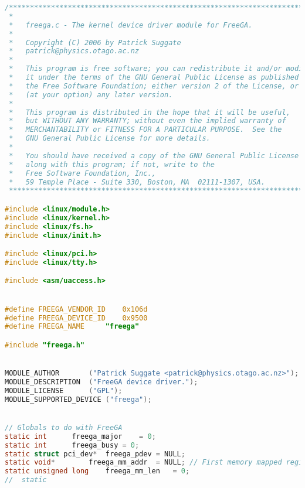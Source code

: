 \begin{lstlisting}[language=C]
/***************************************************************************
 *                                                                         *
 *   freega.c - The kernel device driver module for FreeGA.                *
 *                                                                         *
 *   Copyright (C) 2006 by Patrick Suggate                                 *
 *   patrick@physics.otago.ac.nz                                           *
 *                                                                         *
 *   This program is free software; you can redistribute it and/or modify  *
 *   it under the terms of the GNU General Public License as published by  *
 *   the Free Software Foundation; either version 2 of the License, or     *
 *   (at your option) any later version.                                   *
 *                                                                         *
 *   This program is distributed in the hope that it will be useful,       *
 *   but WITHOUT ANY WARRANTY; without even the implied warranty of        *
 *   MERCHANTABILITY or FITNESS FOR A PARTICULAR PURPOSE.  See the         *
 *   GNU General Public License for more details.                          *
 *                                                                         *
 *   You should have received a copy of the GNU General Public License     *
 *   along with this program; if not, write to the                         *
 *   Free Software Foundation, Inc.,                                       *
 *   59 Temple Place - Suite 330, Boston, MA  02111-1307, USA.             *
 ***************************************************************************/

#include <linux/module.h>
#include <linux/kernel.h>
#include <linux/fs.h>
#include <linux/init.h>

#include <linux/pci.h>
#include <linux/tty.h>

#include <asm/uaccess.h>


#define	FREEGA_VENDOR_ID	0x106d
#define	FREEGA_DEVICE_ID	0x9500
#define	FREEGA_NAME		"freega"

#include "freega.h"


MODULE_AUTHOR		("Patrick Suggate <patrick@physics.otago.ac.nz>");
MODULE_DESCRIPTION	("FreeGA device driver.");
MODULE_LICENSE		("GPL");
MODULE_SUPPORTED_DEVICE	("freega");


// Globals to do with FreeGA
static int		freega_major	= 0;
static int		freega_busy	= 0;
static struct pci_dev*	freega_pdev	= NULL;
static void*		freega_mm_addr	= NULL;	// First memory mapped region
static unsigned long	freega_mm_len	= 0;
//	static


\end{lstlisting}
